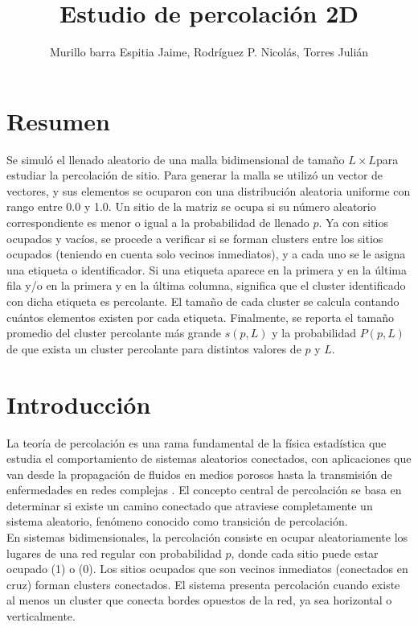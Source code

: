 \documentclass[10pt,twocolumn]{article}
\title{Estudio de percolación 2D}
\author{Murillo barra Espitia Jaime, Rodríguez P. Nicolás, Torres Julián}
\begin{document}
\maketitle

\section{Resumen}
    Se simuló el llenado aleatorio de una malla bidimensional de tamaño $L\times L$para estudiar la percolación de sitio. Para generar la malla se
    utilizó un vector de vectores, y sus elementos se ocuparon con una distribución aleatoria uniforme con rango entre 0.0 y 1.0.
    Un sitio de la matriz se ocupa si su número aleatorio correspondiente es menor o igual a la probabilidad de llenado $p$.
    Ya con sitios ocupados y vacíos, se procede a verificar si se forman clusters entre los sitios ocupados (teniendo en cuenta
    solo vecinos inmediatos), y a cada uno se le asigna una etiqueta o identificador. Si una etiqueta aparece en la primera y en la última fila
    y/o en la primera y en la última columna, significa que el cluster identificado con dicha etiqueta es percolante. El tamaño de cada cluster
    se calcula contando cuántos elementos existen por cada etiqueta. Finalmente, se reporta el tamaño promedio del cluster percolante más grande
    $s(p, L)$ y la probabilidad $P(p, L)$ de que exista un cluster percolante para distintos valores de $p$ y $L$.

\section{Introducción}
    La teoría de percolación es una rama fundamental de la física estadística que estudia el comportamiento de sistemas aleatorios 
    conectados, con aplicaciones que van desde la propagación de fluidos en medios porosos hasta la transmisión de enfermedades en redes 
    complejas \cite{stauffer1994introduction}. El concepto central de percolación se basa en determinar si existe un 
    camino conectado que atraviese completamente un sistema aleatorio, fenómeno conocido como transición de percolación.\\

    En sistemas bidimensionales, la percolación consiste en ocupar aleatoriamente los lugares de una red regular con probabilidad $p$, 
    donde cada sitio puede estar ocupado (1) o (0). Los sitios ocupados que son vecinos inmediatos (conectados en cruz) forman clusters 
    conectados. El sistema presenta percolación cuando existe al menos un cluster que conecta bordes opuestos de la red, ya sea horizontal 
    o verticalmente.\\
\end{document}

